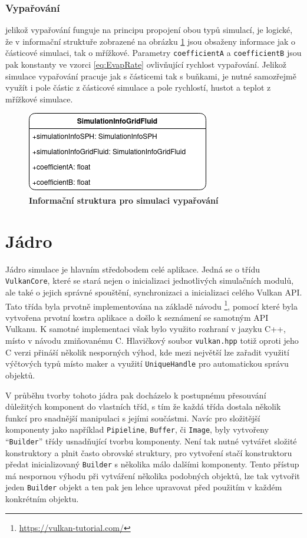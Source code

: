 \subsubsection{Vypařování}
jelikož vypařování funguje na principu propojení obou typů simulací, je logické, že v informační struktuře zobrazené na obrázku \ref{fig:structsEvap} jsou obsaženy informace jak o částicové simulaci, tak o mřížkové. Parametry \texttt{coefficientA} a \texttt{coefficientB} jsou pak konstanty ve vzorci \ref{eq:EvapRate} ovlivňující rychlost vypařování. Jelikož simulace vypařování pracuje jak s částicemi tak s buňkami, je nutné samozřejmě využít i pole částic z částicové simulace a pole rychlostí, hustot a teplot z mřížkové simulace.

\begin{figure}[hbt]
	\centering
	\captionsetup{justification=centering}
	\includegraphics[scale=0.6]{obrazky-figures/SimulationInfo.png}
	\caption{\textbf{Informační struktura pro simulaci vypařování}}
	\label{fig:structsEvap}
\end{figure}


\section{Jádro}
\label{chapter:jadro}

Jádro simulace je hlavním středobodem celé aplikace. Jedná se o třídu \texttt{VulkanCore}, které se stará nejen o inicializaci jednotlivých simulačních modulů, ale také o jejich správné spouštění, synchronizaci a inicializaci celého Vulkan API. Tato třída byla prvotně implementována na základě návodu \footnote{\url{https://vulkan-tutorial.com/}}, pomocí které byla vytvořena prvotní kostra aplikace a došlo k seznámení se samotným API Vulkanu. K samotné implementaci však bylo využito rozhraní v jazyku C++, místo v návodu zmiňovanému C. Hlavičkový soubor \texttt{vulkan.hpp} totiž oproti jeho C verzi přináší několik nesporných výhod, kde mezi největší lze zařadit využití výčtových typů místo maker a využití \texttt{UniqueHandle} pro automatickou správu objektů. 

V průběhu tvorby tohoto jádra pak docházelo k postupnému přesouvání důležitých komponent do vlastních tříd, s tím že každá třída dostala několik funkcí pro snadnější manipulaci s jejími součástmi. Navíc pro složitější komponenty jako například \texttt{Pipieline}, \texttt{Buffer}, či \texttt{Image}, byly vytvořeny \enquote{\texttt{Builder}} třídy usnadňující tvorbu komponenty. Není tak nutné vytvářet složité konstruktory a plnit často obrovské struktury, pro vytvoření stačí konstruktoru předat inicializovaný \texttt{Builder} s několika málo dalšími komponenty. Tento přístup má nespornou výhodu při vytváření několika podobných objektů, lze tak vytvořit jeden \texttt{Builder} objekt a ten pak jen lehce upravovat před použitím v každém konkrétním objektu.

